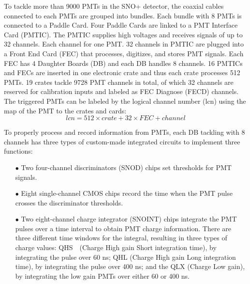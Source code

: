 To tackle more than 9000 PMTs in the SNO+ detector, the coaxial cables connected to each PMTs are grouped into bundles. Each bundle with 8 PMTs is connected to a Paddle Card. Four Paddle Cards are linked to a PMT Interface Card (PMTIC). The PMTIC supplies high voltages and receives signals of up to 32 channels. Each channel for one PMT. 32 channels in PMTIC are plugged into a Front End Card (FEC) that processes, digitizes, and stores PMT signals. Each FEC has 4 Daughter Boards (DB) and each DB handles 8 channels. 16 PMTICs and FECs are inserted in one electronic crate and thus each crate processes 512 PMTs. 19 crates tackle 9728 PMT channels in total, of which 32 channels are reserved for calibration inputs and labeled as FEC Diagnose (FECD) channels. The triggered PMTs can be labeled by the logical channel number (lcn) using the map of the PMT to the crates and cards\cite{snop_jinst,stringer2019sensitivity}:
\begin{equation}
lcn = 512 \times crate + 32 \times FEC + channel
\end{equation}

To properly process and record information from PMTs, each DB tackling with 8 channels has three types of custom-made integrated circuits to implement three functions\cite{boger2000sudbury,bonventre2014neutron,snop_jinst}:
\begin{itemize} 
	\item[$\bullet$] Two four-channel discriminators (SNOD) chips set thresholds for PMT signals.
	\item[$\bullet$] Eight single-channel CMOS chips record the time when the PMT pulse crosses the discriminator thresholds.
	\item[$\bullet$] Two eight-channel charge integrator (SNOINT) chips integrate the PMT pulses over a time interval to obtain PMT charge information. There are three different time windows for the integral, resulting in three types of charge values: QHS　(Charge High gain Short integration time), by integrating the pulse over 60 ns; QHL (Charge High gain Long integration time), by integrating the pulse over 400 ns; and the QLX (Charge Low gain), by integrating the low gain PMTs over either 60 or 400 ns.
\end{itemize}

